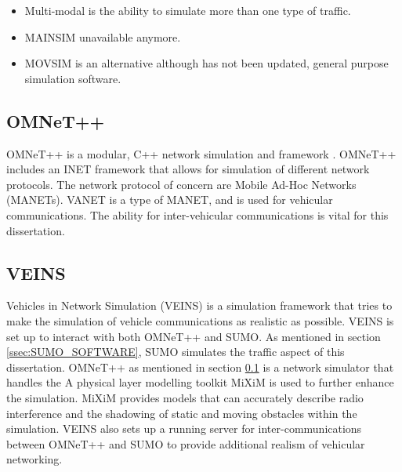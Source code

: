 \begin{table}[H]
\centering
{}
\end{table}

\begin{itemize}
    \item Multi-modal is the ability to simulate more than one type of traffic.
    \item MAINSIM unavailable anymore.
    \item MOVSIM is an alternative although has not been updated, general purpose simulation software.
\end{itemize}


\subsection{OMNeT++} \label{ssec:OMNETT}
OMNeT++ is a modular, C++ network simulation and framework \citep{Varga2008ANENVIRONMENT}. OMNeT++ includes an INET framework that allows for simulation of different network protocols. The network protocol of concern are Mobile Ad-Hoc Networks (MANETs). VANET is a type of MANET, and is used for vehicular communications. The ability for inter-vehicular communications is vital for this dissertation.

\subsection{VEINS}
Vehicles in Network Simulation (VEINS) is a simulation framework that tries to make the simulation of vehicle communications as realistic as possible. VEINS is set up to interact with both OMNeT++ and SUMO. As mentioned in section \ref{ssec:SUMO_SOFTWARE}, SUMO simulates the traffic aspect of this dissertation. OMNeT++ as mentioned in section \ref{ssec:OMNETT} is a network simulator that handles the  A physical layer modelling toolkit MiXiM is used to further enhance the simulation. MiXiM provides models that can accurately describe radio interference and the shadowing of static and moving obstacles within the simulation. VEINS also sets up a running server for inter-communications between OMNeT++ and SUMO to provide additional realism of vehicular networking.